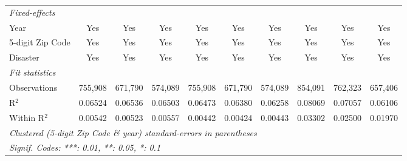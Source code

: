 \begin{tabular}{lccccccccc}
   \midrule
   \emph{Fixed-effects}\\
   Year                                                       & Yes                    & Yes            & Yes           & Yes           & Yes            & Yes           & Yes           & Yes           & Yes\\  
   5-digit Zip Code                                           & Yes                    & Yes            & Yes           & Yes           & Yes            & Yes           & Yes           & Yes           & Yes\\  
   Disaster                                                   & Yes                    & Yes            & Yes           & Yes           & Yes            & Yes           & Yes           & Yes           & Yes\\  
   \midrule
   \emph{Fit statistics}\\
   Observations                                               & 755,908                & 671,790        & 574,089       & 755,908       & 671,790        & 574,089       & 854,091       & 762,323       & 657,406\\  
   R$^2$                                                      & 0.06524                & 0.06536        & 0.06503       & 0.06473       & 0.06380        & 0.06258       & 0.08069       & 0.07057       & 0.06106\\  
   Within R$^2$                                               & 0.00542                & 0.00523        & 0.00557       & 0.00442       & 0.00424        & 0.00443       & 0.03302       & 0.02500       & 0.01970\\  
   \midrule \midrule
   \multicolumn{10}{l}{\emph{Clustered (5-digit Zip Code \& year) standard-errors in parentheses}}\\
   \multicolumn{10}{l}{\emph{Signif. Codes: ***: 0.01, **: 0.05, *: 0.1}}\\
\end{tabular}
\par\endgroup
